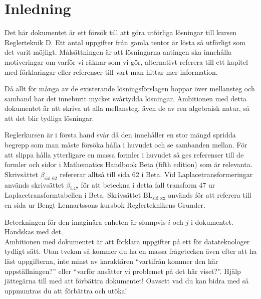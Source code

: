 \documentclass[a4paper]{article}
\newcommand{\mhb}[1]{$\beta_{\text{#1}}$}     %
\newcommand{\bl}[1]{$\text{BL}_{\text{#1}}$}  %
\begin{document}



\section*{Inledning}
Det här dokumentet är ett försök till att göra utförliga lösningar till kursen Reglerteknik D. Ett antal uppgifter från gamla tentor är lösta så utförligt som det varit möjligt. Målsättningen är att lösningarna antingen ska innehålla motiveringar om varför vi räknar som vi gör, alternativt referera till ett kapitel med förklaringar eller referenser till vart man hittar mer information.

Då allt för många av de existerande lösningsförslagen hoppar över mellansteg och samband har det inneburit mycket svårtydda lösningar. Ambitionen med detta dokumentet är att skriva ut alla mellansteg, även de av ren algebraisk natur, så att det blir tydliga lösningar.

Reglerkursen är i första hand svår då den innehåller en stor mängd spridda begrepp som man måste försöka hålla i huvudet och se sambanden mellan. För att slippa hålla ytterligare en massa formler i huvudet så ges referenser till de formler och sidor i Mathematics Handbook Beta (fifth edition) som är relevanta. Skrivsättet \mhb{sid 62} refererar alltså till sida 62 i Beta. Vid Laplacetransformeringar används skrivsättet \mhb{L47} för att beteckna i detta fall transform 47 ur Laplacetransformtabellen i Beta. Skrivsättet \bl{sid xx} används för att referera till en sida ur Bengt Lennartssons kursbok Reglerteknikens Grunder.

Beteckningen för den imaginära enheten är slumpvis $i$ och $j$ i dokumentet. Handskas med det.\\

Ambitionen med dokumentet är att förklara uppgifter på ett för datateknologer tydligt sätt. Utan tvekan så kommer du ha en massa frågetecken även efter att ha läst uppgifterna, inte minst av karaktären ``vartifrån kommer den här uppställningen?'' eller ``varför ansätter vi problemet på det här viset?''. Hjälp jättegärna till med att förbättra dokumentet! Oavsett vad du kan bidra med så uppmuntras du att förbättra och utöka!\\
\end{document}
